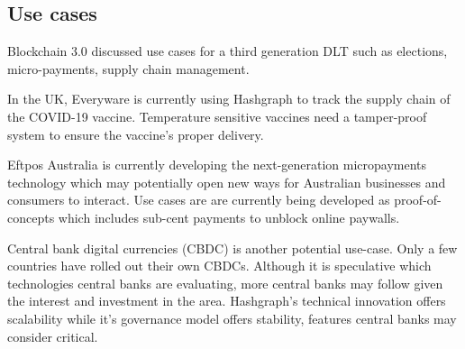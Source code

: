 \subsection{Use cases}

Blockchain 3.0\cite{maesa2020blockchain} discussed use cases for a third generation DLT such as elections, micro-payments, supply chain management.

In the UK, Everyware is currently using Hashgraph to track the supply chain of the COVID-19 vaccine\cite{ryan2021}. Temperature sensitive vaccines need a tamper-proof system to ensure the vaccine's proper delivery.

Eftpos Australia is currently developing the next-generation micropayments technology which may potentially open new ways for Australian businesses and consumers to interact. Use cases are are currently being developed as proof-of-concepts which includes sub-cent payments to unblock online paywalls\cite{eftpos2021}.

Central bank digital currencies\cite{hederacdbc} (CBDC) is another potential use-case. Only a few countries have rolled out their own CBDCs. Although it is speculative which technologies central banks are evaluating, more central banks may follow given the interest and investment in the area. Hashgraph's technical innovation offers scalability while it's governance model offers stability, features central banks may consider critical.





